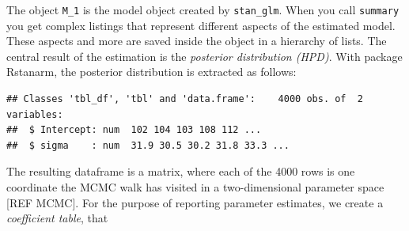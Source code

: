 \documentclass[]{svmono}
\newenvironment{Shaded}{\begin{snugshade}}{\end{snugshade}}
\newcommand{\KeywordTok}[1]{\textcolor[rgb]{0.13,0.29,0.53}{\textbf{#1}}}
\newcommand{\DataTypeTok}[1]{\textcolor[rgb]{0.13,0.29,0.53}{#1}}
\newcommand{\DecValTok}[1]{\textcolor[rgb]{0.00,0.00,0.81}{#1}}
\newcommand{\StringTok}[1]{\textcolor[rgb]{0.31,0.60,0.02}{#1}}
\newcommand{\OperatorTok}[1]{\textcolor[rgb]{0.81,0.36,0.00}{\textbf{#1}}}
\newcommand{\NormalTok}[1]{#1}
\begin{document}
The object \texttt{M\_1} is the model object created by
\texttt{stan\_glm}. When you call \texttt{summary} you get complex
listings that represent different aspects of the estimated model. These
aspects and more are saved inside the object in a hierarchy of lists.
The central result of the estimation is the \emph{posterior distribution
(HPD)}. With package Rstanarm, the posterior distribution is extracted
as follows:

\begin{Shaded}
\end{Shaded}

\begin{verbatim}
## Classes 'tbl_df', 'tbl' and 'data.frame':    4000 obs. of  2 variables:
##  $ Intercept: num  102 104 103 108 112 ...
##  $ sigma    : num  31.9 30.5 30.2 31.8 33.3 ...
\end{verbatim}

The resulting dataframe is a matrix, where each of the 4000 rows is one
coordinate the MCMC walk has visited in a two-dimensional parameter
space {[}REF MCMC{]}. For the purpose of reporting parameter estimates,
we create a \emph{coefficient table}, that

\begin{Shaded}
\end{Shaded}
\end{document}
